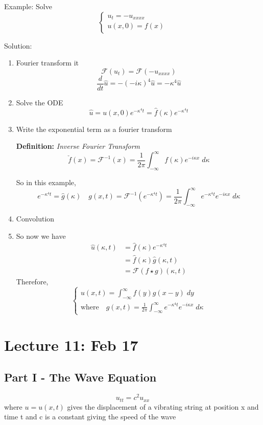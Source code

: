 \documentclass[12pt]{article}
\renewcommand{\hat}[1]{\widehat{#1}}
\newcommand{\F}[1]{\mathcal{F}\left(#1\right)}
\begin{document}
Example: Solve 
\[\begin{cases}
    u_t = -u_{xxxx}\\
    u(x, 0) = f(x)
\end{cases}\]

Solution:
\begin{enumerate}
    \item Fourier transform it
    \[\F{u_t} = \F{-u_{xxxx}}\]
    \[\frac{d}{dt} \hat{u} = -(-i\kappa)^4 \hat{u} = -\kappa^4 \hat{u}\]
    \item Solve the ODE 
    \[\hat{u} = u(x, 0)e^{-\kappa^4t} = \hat{f}(\kappa) e^{-\kappa^4t} \]
    \item Write the exponential term as a fourier transform 
    
    \textbf{Definition:} \emph{Inverse Fourier Transform}
    \[\boxed{\check{f}(x) = \mathcal{F}^{-1}(x) = \frac{1}{2\pi} \int_{-\infty}^\infty f(\kappa) e^{-i\kappa x}\; d\kappa}\]

    So in this example, 
    \[e^{-\kappa^4t} = \hat{g}(\kappa) \quad g(x, t) = \mathcal{F}^{-1}\left(e^{-\kappa^4 t}\right) = \frac{1}{2\pi} \int_{-\infty}^\infty e^{-\kappa^4 t} e^{-i\kappa x}\; d\kappa\]

    \item Convolution 
    \item 
    So now we have 
    \begin{align*}
        \hat{u}(\kappa, t) &= \hat{f}(\kappa)e^{-\kappa^4 t}\\
        &= \hat{f}(\kappa) \hat{g}(\kappa, t)\\
        &= \F{f \star g}(\kappa, t)
    \end{align*}
    Therefore, 
    \[\boxed{\begin{cases}
        u(x, t) = \int_{-\infty}^\infty f(y) g(x - y)\; dy\\
        \text{where} \quad g(x, t) = \frac{1}{2\pi} \int_{-\infty}^\infty e^{-\kappa^4 t} e^{-i\kappa x}\; d\kappa
    \end{cases}}\]
\end{enumerate}

\section{Lecture 11: Feb 17}
\subsection*{Part I - The Wave Equation}
\[u_{tt} = c^2 u_{xx}\]
where $u = u(x, t)$ gives the displacement of a vibrating string at position x and time t and c is a constant giving the speed of the wave  
\end{document}
